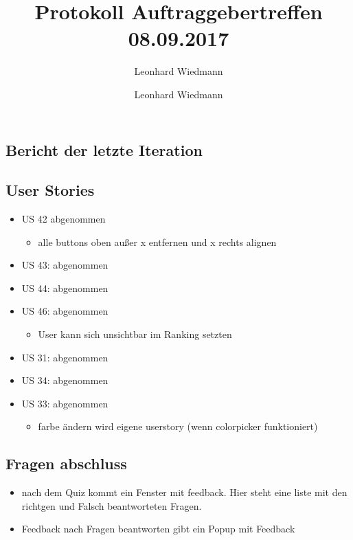 \documentclass[colorback, accentcolor=tud1c, paper=a4]{tudexercise}
\title{Protokoll Auftraggebertreffen 08.09.2017}
\subtitle{Leonhard Wiedmann}
\author{Leonhard Wiedmann}
\begin{document}
\maketitle

\begin{multicols}{2}

\section*{Bericht der letzte Iteration}
\subsection*{User Stories}
\begin{itemize}
	\item US 42 abgenommen
	\begin{itemize}
		\item alle buttons oben außer x entfernen und x rechts alignen
	\end{itemize}
	\item US 43: abgenommen
	\item US 44: abgenommen
	\item US 46: abgenommen
	\begin{itemize}
		\item User kann sich unsichtbar im Ranking setzten
	\end{itemize}
	\item US 31: abgenommen
	\item US 34: abgenommen
	\item US 33: abgenommen
	\begin{itemize}
		\item farbe ändern wird eigene userstory (wenn colorpicker funktioniert)
	\end{itemize}
\end{itemize}

\subsection*{Fragen abschluss}
\begin{itemize}
	\item nach dem Quiz kommt ein Fenster mit feedback. Hier steht eine liste mit den richtgen und Falsch beantworteten Fragen.
\item Feedback nach Fragen beantworten gibt ein Popup mit Feedback
\end{itemize}



\end{multicols}
\end{document}
